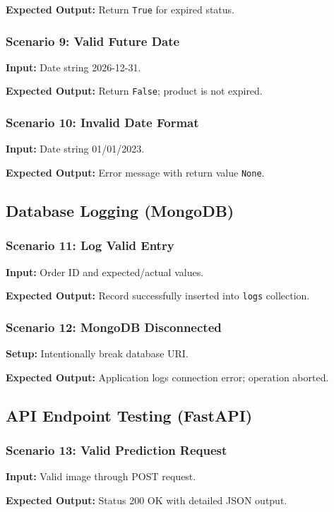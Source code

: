 \documentclass[12pt]{report}
\begin{document}
\textbf{Expected Output:} Return \texttt{True} for expired status.

\subsubsection{Scenario 9: Valid Future Date}
\textbf{Input:} Date string 2026-12-31.

\textbf{Expected Output:} Return \texttt{False}; product is not expired.

\subsubsection{Scenario 10: Invalid Date Format}
\textbf{Input:} Date string 01/01/2023.

\textbf{Expected Output:} Error message with return value \texttt{None}.

\subsection{Database Logging (MongoDB)}

\subsubsection{Scenario 11: Log Valid Entry}
\textbf{Input:} Order ID and expected/actual values.

\textbf{Expected Output:} Record successfully inserted into \texttt{logs} collection.

\subsubsection{Scenario 12: MongoDB Disconnected}
\textbf{Setup:} Intentionally break database URI.

\textbf{Expected Output:} Application logs connection error; operation aborted.

\subsection{API Endpoint Testing (FastAPI)}

\subsubsection{Scenario 13: Valid Prediction Request}
\textbf{Input:} Valid image through POST request.

\textbf{Expected Output:} Status 200 OK with detailed JSON output.
\end{document}
